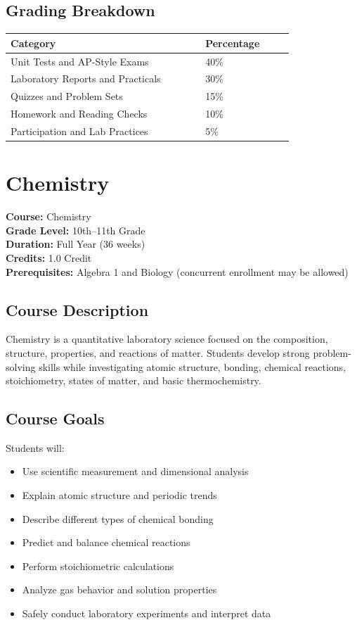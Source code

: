 \documentclass[12pt,oneside]{book}
\begin{document}
\section{Grading Breakdown}
\begin{center}
\begin{tabular}{L{0.55\linewidth}L{0.25\linewidth}}
\toprule
\textbf{Category} & \textbf{Percentage} \\
\midrule
Unit Tests and AP-Style Exams & 40\% \\
Laboratory Reports and Practicals & 30\% \\
Quizzes and Problem Sets & 15\% \\
Homework and Reading Checks & 10\% \\
Participation and Lab Practices & 5\% \\
\bottomrule
\end{tabular}
\end{center}

\chapter{Chemistry}

\noindent\textbf{Course:} Chemistry\\
\textbf{Grade Level:} 10th--11th Grade\\
\textbf{Duration:} Full Year (36 weeks)\\
\textbf{Credits:} 1.0 Credit\\
\textbf{Prerequisites:} Algebra 1 and Biology (concurrent enrollment may be allowed)

\section{Course Description}
Chemistry is a quantitative laboratory science focused on the composition, structure, properties,
and reactions of matter. Students develop strong problem-solving skills while investigating atomic
structure, bonding, chemical reactions, stoichiometry, states of matter, and basic thermochemistry.

\section{Course Goals}
Students will:
\begin{itemize}[leftmargin=2em]
    \item Use scientific measurement and dimensional analysis
    \item Explain atomic structure and periodic trends
    \item Describe different types of chemical bonding
    \item Predict and balance chemical reactions
    \item Perform stoichiometric calculations
    \item Analyze gas behavior and solution properties
    \item Safely conduct laboratory experiments and interpret data
\end{itemize}
\end{document}
